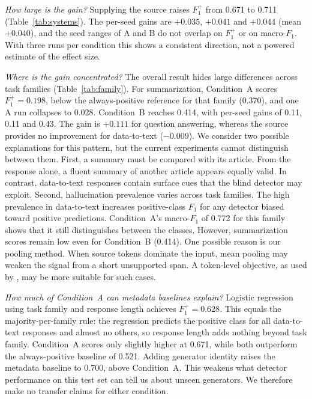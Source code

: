 \documentclass[conference]{IEEEtran}
\begin{document}
\textit{How large is the gain?} Supplying the source raises $F_1^{+}$ from
0.671 to 0.711 (Table~\ref{tab:systems}). The per-seed gains are $+0.035$,
$+0.041$ and $+0.044$ (mean $+0.040$), and the seed ranges of A and B do not
overlap on $F_1^{+}$ or on macro-$F_1$. With three runs per condition this
shows a consistent direction, not a powered estimate of the effect size.

\textit{Where is the gain concentrated?} The overall result hides large
differences across task families (Table~\ref{tab:family}). For summarization,
Condition~A scores $F_1^{+}=0.198$, below the always-positive reference for that
family (0.370), and one A run collapses to 0.028. Condition~B reaches 0.414,
with per-seed gains of 0.11, 0.11 and 0.43. The gain is $+0.111$ for question answering, whereas
the source provides no improvement for data-to-text ($-0.009$). We consider two
possible explanations for this pattern, but the current experiments cannot
distinguish between them. First, a summary must be compared with its article.
From the response alone, a fluent summary of another article appears equally
valid. In contrast, data-to-text responses contain surface cues that the blind
detector may exploit. Second, hallucination prevalence varies across task
families. The high prevalence in data-to-text increases positive-class $F_1$
for any detector biased toward positive predictions. Condition~A's macro-$F_1$
of 0.772 for this family shows that it still distinguishes between the classes.
However, summarization scores remain low even for Condition~B (0.414). One
possible reason is our pooling method. When source tokens dominate the input,
mean pooling may weaken the signal from a short unsupported span. A token-level
objective, as used by \cite{kovacs2025lettucedetect}, may be more suitable for
such cases.

\textit{How much of Condition~A can metadata baselines explain?} Logistic
regression using task family and response length achieves
$F_1^{+}=0.628$. This equals the majority-per-family rule: the regression
predicts the positive class for all data-to-text responses and almost no others,
so response length adds nothing beyond task family.
Condition~A scores only slightly higher at 0.671, while both
outperform the always-positive baseline of 0.521. Adding generator identity
raises the metadata baseline to 0.700, above Condition~A. This weakens what
detector performance on this test set can tell us about unseen generators. We therefore make no transfer claims for
either condition.
\end{document}

